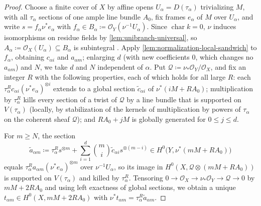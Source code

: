 \documentclass[11pt,a4paper]{article}
\begin{document}
\begin{proof}
Choose a finite cover of $X$ by affine opens $U_\alpha=D(\tau_\alpha)$ trivializing $M$, with all $\tau_\alpha$ sections of one ample line bundle $A_0$, fix frames $e_\alpha$ of $M$ over $U_\alpha$, and write $s=f_\alpha\nu^*e_\alpha$ with $f_\alpha\in B_\alpha\coloneqq\mathcal O_Y(\nu^{-1}U_\alpha)$. Since $\operatorname{char}k=0$, $\nu$ induces isomorphisms on residue fields by \cref{lem:unibranch-universal}, so $A_\alpha\coloneqq\mathcal O_X(U_\alpha)\subseteq B_\alpha$ is subintegral \cite[\href{https://stacks.math.columbia.edu/tag/0CND}{Tag 0CND}]{Stacks}. Apply \cref{lem:normalization-local-sandwich} to $f_\alpha$, obtaining $c_{\alpha i}$ and $a_{\alpha m}$; enlarging $d$ (with new coefficients $0$, which changes no $a_{\alpha m}$) and $N$, we take $d$ and $N$ independent of $\alpha$. Put $\mathcal Q\coloneqq\nu_*\mathcal O_Y/\mathcal O_X$, and fix an integer $R$ with the following properties, each of which holds for all large $R$: each $\tau_\alpha^Rc_{\alpha i}(\nu^*e_\alpha)^{\otimes i}$ extends to a global section $\widetilde c_{\alpha i}$ of $\nu^*(iM+RA_0)$; multiplication by $\tau_\alpha^R$ kills every section of a twist of $\mathcal Q$ by a line bundle that is supported on $V(\tau_\alpha)$ (locally, by stabilization of the kernels of multiplication by powers of $\tau_\alpha$ on the coherent sheaf $\mathcal Q$); and $RA_0+jM$ is globally generated for $0\leq j\leq d$.

For $m\geq N$, the section
\[
 \widetilde a_{\alpha m}\coloneqq\tau_\alpha^Rs^{\otimes m}+\sum_{i=1}^{d}\binom mi\widetilde c_{\alpha i}s^{\otimes(m-i)}\in H^0\bigl(Y,\nu^*(mM+RA_0)\bigr)
\]
equals $\tau_\alpha^Ra_{\alpha m}(\nu^*e_\alpha)^{\otimes m}$ over $\nu^{-1}U_\alpha$, so its image in $H^0(X,\mathcal Q\otimes(mM+RA_0))$ is supported on $V(\tau_\alpha)$ and killed by $\tau_\alpha^R$. Tensoring $0\to\mathcal O_X\to\nu_*\mathcal O_Y\to\mathcal Q\to0$ by $mM+2RA_0$ and using left exactness of global sections, we obtain a unique $t_{\alpha m}\in H^0(X,mM+2RA_0)$ with $\nu^*t_{\alpha m}=\tau_\alpha^R\widetilde a_{\alpha m}$.


\end{proof}
\end{document}
